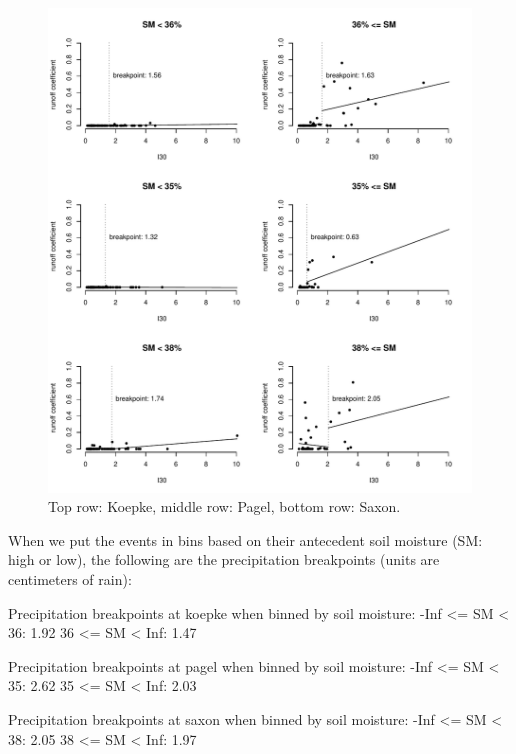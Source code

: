 \documentclass[12pt]{article}
\begin{document}
\begin{figure}
    \begin{center}
\includegraphics{runoff-I30_binned2}
    \end{center}
    \caption{Top row: Koepke, middle row: Pagel, bottom row: Saxon.\label{I30_binned2}}
\end{figure}


When we put the events in bins based on their antecedent soil moisture (SM: high or low), the following are the precipitation breakpoints (units are centimeters of rain):\\

\begin{Schunk}
\begin{Soutput}
Precipitation breakpoints at koepke when binned by soil moisture:
-Inf <= SM < 36: 1.92
36 <= SM < Inf: 1.47

Precipitation breakpoints at pagel when binned by soil moisture:
-Inf <= SM < 35: 2.62
35 <= SM < Inf: 2.03

Precipitation breakpoints at saxon when binned by soil moisture:
-Inf <= SM < 38: 2.05
38 <= SM < Inf: 1.97
\end{Soutput}
\end{Schunk}
\end{document}
